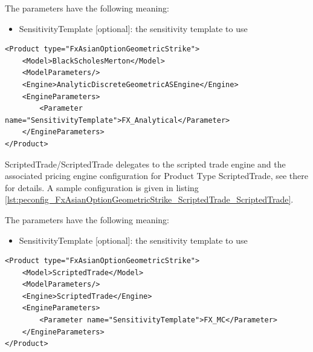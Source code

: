 The parameters have the following meaning:

\begin{itemize}
\item SensitivityTemplate [optional]: the sensitivity template to use
\end{itemize}

\begin{longlisting}
\begin{verbatim}
<Product type="FxAsianOptionGeometricStrike">
    <Model>BlackScholesMerton</Model>
    <ModelParameters/>
    <Engine>AnalyticDiscreteGeometricASEngine</Engine>
    <EngineParameters>
        <Parameter name="SensitivityTemplate">FX_Analytical</Parameter>
    </EngineParameters>
</Product>
\end{verbatim}
\caption{Configuration for Product FxAsianOptionGeometricStrike, Model BlackScholesMerton, Engine AnalyticDiscreteGeomtetricASEngine}
\label{lst:peconfig_FxAsianOptionGeometricStrike_BlackScholesMerton_AnalyticDiscreteGeomtetricASEngine}
\end{longlisting}

ScriptedTrade/ScriptedTrade delegates to the scripted trade engine and the associated pricing engine configuration for
Product Type ScriptedTrade, see there for details. A sample configuration is given in listing
\ref{lst:peconfig_FxAsianOptionGeometricStrike_ScriptedTrade_ScriptedTrade}.

The parameters have the following meaning:

\begin{itemize}
\item SensitivityTemplate [optional]: the sensitivity template to use
\end{itemize}

\begin{longlisting}
\begin{verbatim}
<Product type="FxAsianOptionGeometricStrike">
    <Model>ScriptedTrade</Model>
    <ModelParameters/>
    <Engine>ScriptedTrade</Engine>
    <EngineParameters>
        <Parameter name="SensitivityTemplate">FX_MC</Parameter>
    </EngineParameters>
</Product>
\end{verbatim}
\caption{Configuration for Product FxAsianOptionGeometricStrike, Model ScriptedTrade, Engine ScriptedTrade}
\label{lst:peconfig_FxAsianOptionGeometricStrike_ScriptedTrade_ScriptedTrade}
\end{longlisting}

